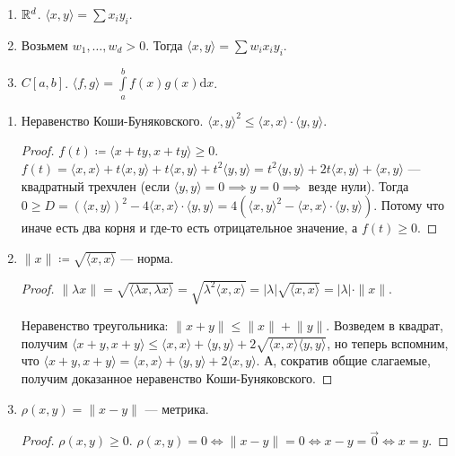 \begin{example}
    \begin{enumerate}
        \item $\mathbb{R}^d$.  $\langle x, y\rangle = \sum x_iy_i$.
        \item Возьмем $w_1, \ldots, w_d > 0$. Тогда $\langle x, y \rangle = \sum w_i x_i y_i$.
        \item $C[a, b]$.  $\langle f, g \rangle = \int\limits_a^b f(x)g(x) \mathrm{d}x$.
    \end{enumerate}
\end{example}
\begin{properties}
    \begin{enumerate}
        \item Неравенство Коши-Буняковского. $\langle x, y \rangle^2 \le \langle x, x \rangle \cdot \langle y, y\rangle$.
            \begin{proof}
                $f(t) \coloneqq \langle x+ty, x +ty \rangle \ge 0$. $f(t) = \langle x, x \rangle + t\langle x, y \rangle + t\langle x, y \rangle + t^2 \langle y, y \rangle = t^2 \langle y, y\rangle + 2t\langle x, y \rangle + \langle x, y \rangle$ --- квадратный трехчлен (если $\langle y, y \rangle = 0 \implies y = 0 \implies$ везде нули). Тогда $0 \ge D= (\langle x, y \rangle)^2 - 4 \langle x, x\rangle \cdot \langle y, y \rangle = 4(\langle x, y \rangle^2 - \langle x, x\rangle \cdot \langle y, y \rangle)$. Потому что иначе есть два корня и где-то есть отрицательное значение, а $f(t) \geq 0$.
            \end{proof}
        \item $\|x\| \coloneqq \sqrt{\langle x, x \rangle}$ --- норма.
             \begin{proof}
                $\|\lambda x\| = \sqrt{\langle \lambda x, \lambda x\rangle} = \sqrt{\lambda^2\langle x, x \rangle} = |\lambda| \sqrt{\langle x, x \rangle} = |\lambda| \cdot \|x\|$.

                Неравенство треугольника: $\lVert x+y \rVert \le \lVert x \rVert + \lVert y \rVert$.
                Возведем в квадрат, получим $\langle x + y, x + y\rangle \le \langle x, x\rangle + \langle y, y\rangle + 2\sqrt{\langle x, x\rangle\langle y, y\rangle}$, но теперь вспомним, что $\langle x + y, x + y\rangle = \langle x, x\rangle + \langle y, y\rangle + 2\langle x, y\rangle$.
                А, сократив общие слагаемые, получим доказанное неравенство Коши-Буняковского.
            \end{proof}
        \item $\rho(x, y) = \lVert x - y \rVert$ --- метрика.
            \begin{proof}
                $\rho(x, y) \ge 0$. $\rho(x, y) = 0 \iff \lVert x - y \rVert = 0 \iff x - y = \overrightarrow{0} \iff x = y$.


\end{proof}
\end{enumerate}
\end{properties}
